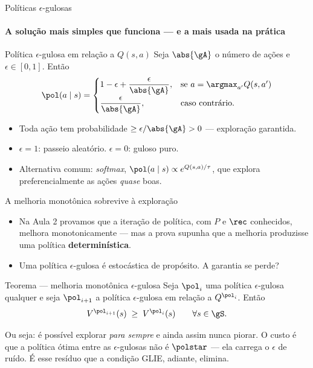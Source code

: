 \documentclass[aspectratio=169, 11pt]{beamer}
\begin{document}
\begin{frame}{Políticas $\epsilon$-gulosas}
  \framesubtitle{A solução mais simples que funciona --- e a mais usada na prática}

  \begin{defbox}{Política $\epsilon$-gulosa em relação a $Q(s,a)$}
    Seja $\abs{\gA}$ o número de ações e $\epsilon \in [0,1]$. Então
    \[
      \pol(a \mid s) =
      \begin{cases}
        1 - \epsilon + \dfrac{\epsilon}{\abs{\gA}}, & \text{se } a = \argmax_{a'} Q(s,a')\\[1.6ex]
        \dfrac{\epsilon}{\abs{\gA}}, & \text{caso contrário.}
      \end{cases}
    \]
  \end{defbox}

  \begin{itemize}\setlength{\itemsep}{0.3ex}
    \item Toda ação tem probabilidade $\ge \epsilon/\abs{\gA} > 0$ ---
      exploração garantida.
    \item $\epsilon = 1$: passeio aleatório. \quad $\epsilon = 0$: guloso puro.
    \item Alternativa comum: \emph{softmax}, $\pol(a\mid s) \propto e^{Q(s,a)/\tau}$,
      que explora preferencialmente as ações \emph{quase} boas.
  \end{itemize}
\end{frame}

\begin{frame}{A melhoria monotônica sobrevive à exploração}

  \begin{itemize}\setlength{\itemsep}{0.35ex}
    \item Na Aula 2 provamos que a iteração de política, com $P$ e $\rec$
      conhecidos, melhora monotonicamente --- mas a prova supunha que a
      melhoria produzisse uma política \textbf{determinística}.
    \item Uma política $\epsilon$-gulosa é estocástica de propósito. A
      garantia se perde?
  \end{itemize}

  \begin{teobox}{Teorema — melhoria monotônica $\epsilon$-gulosa}
    Seja $\pol_i$ uma política $\epsilon$-gulosa qualquer e seja
    $\pol_{i+1}$ a política $\epsilon$-gulosa em relação a $Q^{\pol_i}$.
    Então
    \[ V^{\pol_{i+1}}(s) \;\ge\; V^{\pol_i}(s) \qquad \forall s \in \gS. \]
  \end{teobox}

  \vspace{-0.4em}
  \begin{ideiabox}
    Ou seja: é possível explorar \emph{para sempre} e ainda assim nunca
    piorar. O custo é que a política ótima entre as $\epsilon$-gulosas não
    é $\polstar$ --- ela carrega o $\epsilon$ de ruído. É esse resíduo que a
    condição GLIE, adiante, elimina.
  \end{ideiabox}
\end{frame}
\end{document}
